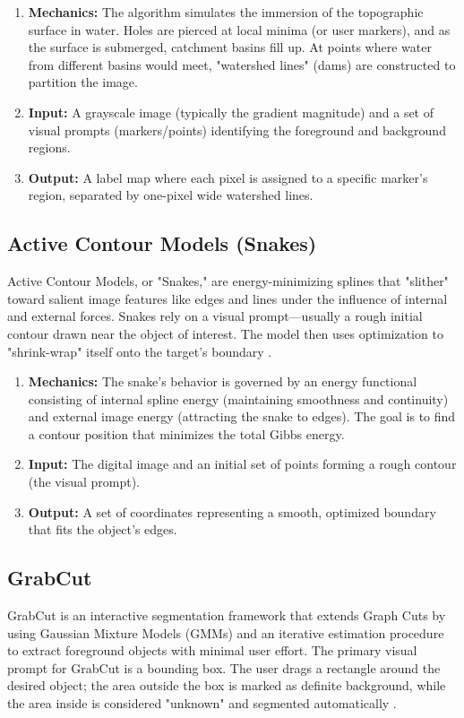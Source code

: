 \begin{enumerate}
	\item \textbf{Mechanics:} 
	The algorithm simulates the immersion of the topographic surface in water. Holes are pierced at local minima (or user markers), and as the surface is submerged, catchment basins fill up. At points where water from different basins would meet, "watershed lines" (dams) are constructed to partition the image.
	
	\item \textbf{Input:} 
	A grayscale image (typically the gradient magnitude) and a set of visual prompts (markers/points) identifying the foreground and background regions.
	
	\item \textbf{Output:} 
	A label map where each pixel is assigned to a specific marker's region, separated by one-pixel wide watershed lines.
\end{enumerate}

\subsection{Active Contour Models (Snakes)}
Active Contour Models, or "Snakes," are energy-minimizing splines that "slither" toward salient image features like edges and lines under the influence of internal and external forces. Snakes rely on a visual prompt—usually a rough initial contour drawn near the object of interest. The model then uses optimization to "shrink-wrap" itself onto the target's boundary \cite{snakes_1988}.

\begin{enumerate}
	\item \textbf{Mechanics:} 
	The snake's behavior is governed by an energy functional consisting of internal spline energy (maintaining smoothness and continuity) and external image energy (attracting the snake to edges). The goal is to find a contour position that minimizes the total Gibbs energy.
	
	\item \textbf{Input:} 
	The digital image and an initial set of points forming a rough contour (the visual prompt).
	
	\item \textbf{Output:} 
	A set of coordinates representing a smooth, optimized boundary that fits the object's edges.
\end{enumerate}


\subsection{GrabCut}
GrabCut is an interactive segmentation framework that extends Graph Cuts by using Gaussian Mixture Models (GMMs) and an iterative estimation procedure to extract foreground objects with minimal user effort. The primary visual prompt for GrabCut is a bounding box. The user drags a rectangle around the desired object; the area outside the box is marked as definite background, while the area inside is considered "unknown" and segmented automatically \cite{grab_cut_2004}.

